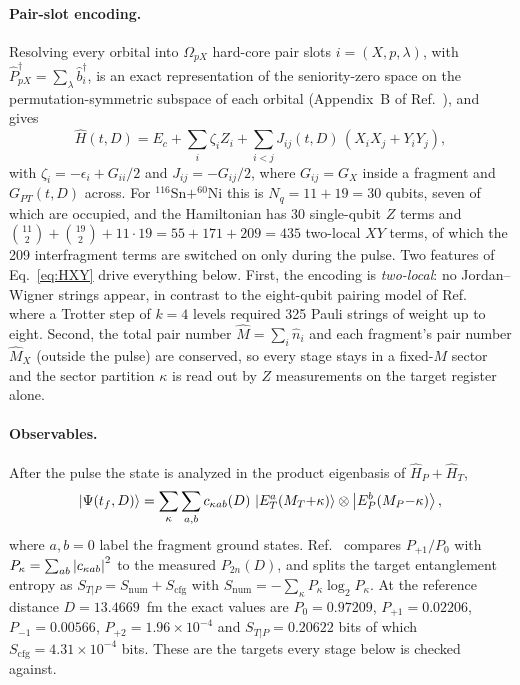 \documentclass[
  aps,
  prc,
  reprint,
  superscriptaddress,
  floatfix,
  nofootinbib
]{revtex4-2}
\newcommand{\HP}{\hat H_{P}}
\newcommand{\HT}{\hat H_{T}}
\newcommand{\Snum}{S_{\mathrm{num}}}
\newcommand{\Scfg}{S_{\mathrm{cfg}}}
\newcommand{\Sn}{^{116}\mathrm{Sn}}
\newcommand{\Ni}{^{60}\mathrm{Ni}}
\begin{document}
\paragraph{Pair-slot encoding.}
Resolving every orbital into $\Omega_{pX}$ hard-core pair slots
$i=(X,p,\lambda)$, with $\hat P^\dagger_{pX}=\sum_\lambda\hat b^\dagger_{i}$,
is an exact representation of the seniority-zero space on the
permutation-symmetric subspace of each orbital
(Appendix~B of Ref.~\cite{TwoFragment2026}), and gives
\begin{equation}
  \hat H(t,D)=E_c+\sum_i\zeta_iZ_i+\sum_{i<j}J_{ij}(t,D)\,(X_iX_j+Y_iY_j),
  \label{eq:HXY}
\end{equation}
with $\zeta_i=-\epsilon_i+G_{ii}/2$ and $J_{ij}=-G_{ij}/2$, where
$G_{ij}=G_X$ inside a fragment and $G_{PT}(t,D)$ across.  For $\Sn+\Ni$ this
is $N_q=11+19=30$ qubits, seven of which are occupied, and the Hamiltonian
has 30 single-qubit $Z$ terms and $\binom{11}{2}+\binom{19}{2}+11\cdot19
=55+171+209=435$ two-local $XY$ terms, of which the 209 interfragment
terms are switched on only during the pulse.  Two features of
Eq.~\eqref{eq:HXY} drive everything below.  First, the encoding is
\emph{two-local}: no Jordan--Wigner strings appear, in contrast to the
eight-qubit pairing model of Ref.~\cite{EigenQPairing2026} where a Trotter
step of $k=4$ levels required 325 Pauli strings of weight up to eight.
Second, the total pair number $\hat M=\sum_i\hat n_i$ and each fragment's
pair number $\hat M_X$ (outside the pulse) are conserved, so every stage
stays in a fixed-$M$ sector and the sector partition $\kappa$ is read out by
$Z$ measurements on the target register alone.

\paragraph{Observables.}
After the pulse the state is analyzed in the product eigenbasis of
$\HP+\HT$,
\begin{equation}
  \ket{\Psi(t_f,D)}=\sum_{\kappa}\sum_{a,b}c_{\kappa ab}(D)\,
  \ket{E^{a}_{T}(M_T{+}\kappa)}\otimes\ket{E^{b}_{P}(M_P{-}\kappa)},
  \label{eq:final}
\end{equation}
where $a,b=0$ label the fragment ground states.  Ref.~\cite{TwoFragment2026}
compares $P_{+1}/P_0$ with $P_\kappa=\sum_{ab}\abs{c_{\kappa ab}}^2$ to the
measured $P_{2n}(D)$, and splits the target entanglement entropy as
$S_{T|P}=\Snum+\Scfg$ with $\Snum=-\sum_\kappa P_\kappa\log_2P_\kappa$.  At
the reference distance $D=13.4669$~fm the exact values are $P_0=0.97209$,
$P_{+1}=0.02206$, $P_{-1}=0.00566$, $P_{+2}=1.96\times10^{-4}$ and
$S_{T|P}=0.20622$ bits of which $\Scfg=4.31\times10^{-4}$ bits.  These are
the targets every stage below is checked against.
\end{document}
